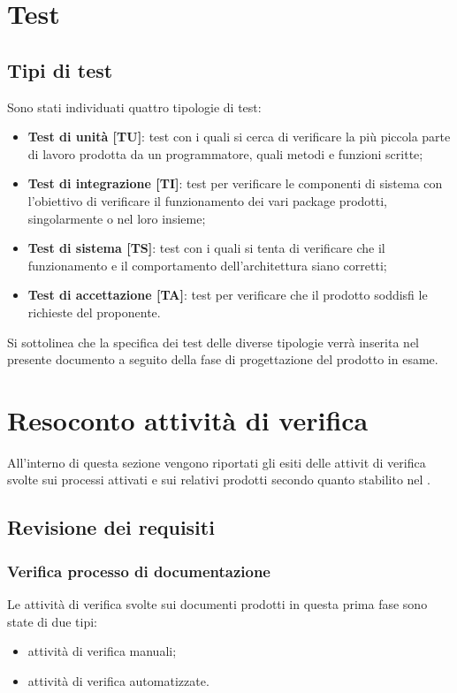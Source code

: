 \newpage
\section{Test}
	\subsection{Tipi di test}
	Sono stati individuati quattro tipologie di test:
	\begin{itemize}
		\item \textbf{Test di unità [TU]}: test con i quali si cerca di verificare la più piccola parte di lavoro prodotta da un programmatore, quali metodi e funzioni scritte;
		\item \textbf{Test di integrazione [TI]}: test per verificare le componenti di sistema con l'obiettivo di verificare il funzionamento dei vari package prodotti, singolarmente o nel loro insieme;
		\item \textbf{Test di sistema [TS]}: test con i quali si tenta di verificare che il funzionamento e il comportamento dell'architettura siano corretti;
		\item \textbf{Test di accettazione [TA]}: test per verificare che il prodotto soddisfi le richieste del proponente.
	\end{itemize}
	Si sottolinea che la specifica dei test delle diverse tipologie verrà inserita nel presente documento a seguito della fase di progettazione del prodotto in esame.

\newpage
\section{Resoconto attività di verifica}
All'interno di questa sezione vengono riportati gli esiti delle attivit di verifica svolte sui processi attivati e sui relativi prodotti secondo quanto stabilito nel \PdP.
	\subsection{Revisione dei requisiti}
		\subsubsection{Verifica processo di documentazione}
		Le attività di verifica svolte sui documenti prodotti in questa prima fase sono state di due tipi:
		\begin{itemize}		
			\item attività di verifica manuali;
			\item attività di verifica automatizzate.
		\end{itemize}
		
